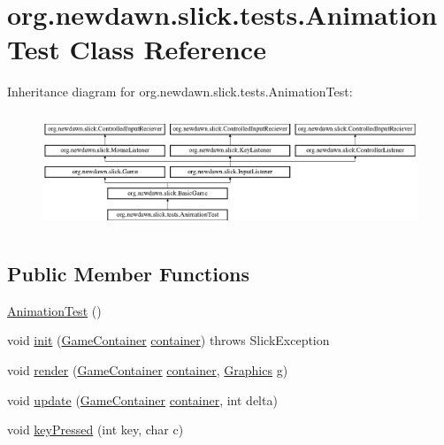 \hypertarget{classorg_1_1newdawn_1_1slick_1_1tests_1_1_animation_test}{}\section{org.\+newdawn.\+slick.\+tests.\+Animation\+Test Class Reference}
\label{classorg_1_1newdawn_1_1slick_1_1tests_1_1_animation_test}
Inheritance diagram for org.\+newdawn.\+slick.\+tests.\+Animation\+Test\+:\begin{figure}[H]
\begin{center}
\leavevmode
\includegraphics[height=3.522012cm]{classorg_1_1newdawn_1_1slick_1_1tests_1_1_animation_test}
\end{center}
\end{figure}
\subsection*{Public Member Functions}
\begin{DoxyCompactItemize}
\item 
\mbox{\hyperlink{classorg_1_1newdawn_1_1slick_1_1tests_1_1_animation_test_a8cf7ef8e4d51a272a677c3b8a8954f8a}{Animation\+Test}} ()
\item 
void \mbox{\hyperlink{classorg_1_1newdawn_1_1slick_1_1tests_1_1_animation_test_ac9213c0ac4989f2195db9bb9716795de}{init}} (\mbox{\hyperlink{classorg_1_1newdawn_1_1slick_1_1_game_container}{Game\+Container}} \mbox{\hyperlink{classorg_1_1newdawn_1_1slick_1_1tests_1_1_animation_test_ad2142f4fe5667df82eb8ead44f81e1b1}{container}})  throws Slick\+Exception 
\item 
void \mbox{\hyperlink{classorg_1_1newdawn_1_1slick_1_1tests_1_1_animation_test_a233fe14eb133525693b64428d37e20ce}{render}} (\mbox{\hyperlink{classorg_1_1newdawn_1_1slick_1_1_game_container}{Game\+Container}} \mbox{\hyperlink{classorg_1_1newdawn_1_1slick_1_1tests_1_1_animation_test_ad2142f4fe5667df82eb8ead44f81e1b1}{container}}, \mbox{\hyperlink{classorg_1_1newdawn_1_1slick_1_1_graphics}{Graphics}} g)
\item 
void \mbox{\hyperlink{classorg_1_1newdawn_1_1slick_1_1tests_1_1_animation_test_a83727748d87c924fb9736408ff511464}{update}} (\mbox{\hyperlink{classorg_1_1newdawn_1_1slick_1_1_game_container}{Game\+Container}} \mbox{\hyperlink{classorg_1_1newdawn_1_1slick_1_1tests_1_1_animation_test_ad2142f4fe5667df82eb8ead44f81e1b1}{container}}, int delta)
\item 
void \mbox{\hyperlink{classorg_1_1newdawn_1_1slick_1_1tests_1_1_animation_test_a263af8181368e67918736e55a4d9a352}{key\+Pressed}} (int key, char c)
\end{DoxyCompactItemize}
